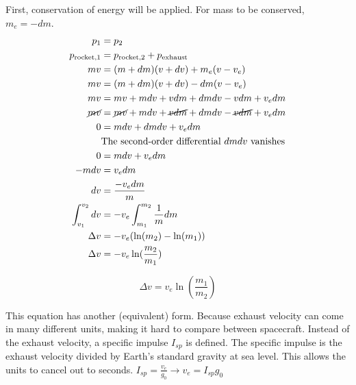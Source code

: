 \documentclass[../basicOrbitalDynamics.tex]{subfiles}
\begin{document}
First, conservation of energy will be applied. For mass to be conserved, $m_e=-dm$.
\begin{align*}
    p_1                & =p_2                                                  \\
    {p}_\text{rocket,1}  & ={p}_\text{rocket,2}+{p}_\text{exhaust}                   \\
    mv                 & =(m+dm)(v+dv)+m_e(v-v_e)                              \\
    mv                 & =(m+dm)(v+dv)-dm(v-v_e)                               \\
    mv                 & =mv+mdv+vdm+dmdv-vdm+v_e dm                            \\
    \cancel{mv}        & =\cancel{mv}+mdv+\cancel{vdm}+dmdv-\cancel{vdm}+v_e dm \\
    0                  & =mdv+dmdv+v_e dm                                       \\
                       & \text{The second-order differential $dmdv$ vanishes}  \\
    0                  & =mdv+v_e dm                                            \\
    -mdv               & =v_e dm                                                \\
    dv                 & =\frac{-v_e dm}{m}                                     \\
    \int_{v_1}^{v_2}dv & =-v_e\int_{m_1}^{m_2}\frac{1}{m}dm                    \\
    \Delta{}v          & =-v_e(\ln(m_2)-\ln(m_1))                              \\
    \Delta{}v          & =-v_e\ln(\frac{m_2}{m_1})                             \\
\end{align*}

\begin{equation}\label{Rocket Equation Ve}
    \Delta{}v=v_e\ln\left(\frac{m_1}{m_2}\right)
\end{equation}

This equation has another (equivalent) form. Because exhaust velocity can come in many different units, making it hard to compare between spacecraft. Instead of the exhaust velocity, a specific impulse $I_{sp}$ is defined. The specific impulse is the exhaust velocity divided by Earth's standard gravity at sea level. This allows the units to cancel out to seconds. $I_{sp}=\frac{v_e}{g_0}\rightarrow{}v_e=I_{sp}g_0$
\end{document}
